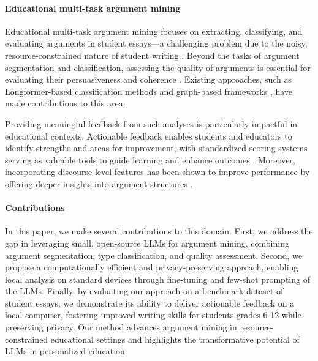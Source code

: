    \paragraph{Educational multi-task argument mining}%
   Educational multi-task argument mining focuses on extracting, classifying, and evaluating arguments in student essays—a challenging problem due to the noisy, resource-constrained nature of student writing \cite{kashefi2023argument}. Beyond the tasks of argument segmentation and classification, assessing the quality of arguments is essential for evaluating their persuasiveness and coherence \cite{wachsmuth2024argument}. Existing approaches, such as Longformer-based classification methods \cite{ding2022don} and graph-based frameworks \cite{marro2022graph}, have made contributions to this area. 

   Providing meaningful feedback from such analyses is particularly impactful in educational contexts. Actionable feedback enables students and educators to identify strengths and areas for improvement, with standardized scoring systems serving as valuable tools to guide learning and enhance outcomes \cite{cabrio2018five}. Moreover, incorporating discourse-level features has been shown to improve performance by offering deeper insights into argument structures  \cite{deshpande2023contextualizing}.

  \paragraph{Contributions} In this paper, we make several contributions to this domain. First, we address the gap in leveraging small, open-source LLMs for argument mining, combining argument segmentation, type classification, and quality assessment. Second, we propose a computationally efficient and privacy-preserving approach, enabling local analysis on standard devices through fine-tuning and few-shot prompting of the LLMs. Finally, by evaluating our approach on a benchmark dataset of student essays, we demonstrate its ability to deliver actionable feedback on a local computer, fostering improved writing skills for students grades 6-12 while preserving privacy. Our method advances argument mining in resource-constrained educational settings and highlights the transformative potential of LLMs in personalized education.